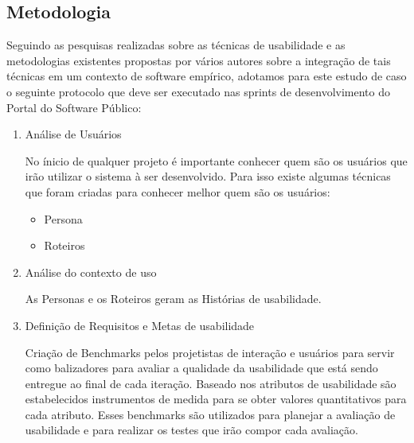 
\subsection{Metodologia}

	Seguindo as pesquisas realizadas sobre as técnicas de usabilidade e as metodologias existentes propostas por vários autores sobre a integração de tais técnicas em um contexto de software empírico, adotamos para este estudo de caso o seguinte protocolo que deve ser executado nas sprints de desenvolvimento do Portal do Software Público:
	
	
\begin{enumerate}

\item Análise de Usuários
	
	No ínicio de qualquer projeto é importante conhecer quem são os usuários que irão utilizar o sistema à ser desenvolvido. Para isso existe algumas técnicas que foram criadas para conhecer melhor quem são os usuários:
	
	\begin{itemize}
		\item Persona
		\item Roteiros		
	\end{itemize}
		
\item Análise do contexto de uso

		As Personas e os Roteiros geram as Histórias de usabilidade.

\item Definição de Requisitos e Metas de usabilidade

	Criação de Benchmarks pelos projetistas de interação e usuários para servir como balizadores para avaliar a qualidade da usabilidade que está sendo entregue ao final de cada iteração.
	Baseado nos atributos de usabilidade são estabelecidos instrumentos de medida para se obter valores quantitativos 	para cada atributo.
	Esses benchmarks são utilizados para planejar a avaliação de usabilidade e para realizar os testes que irão compor cada avaliação. %
	

\end{enumerate}
